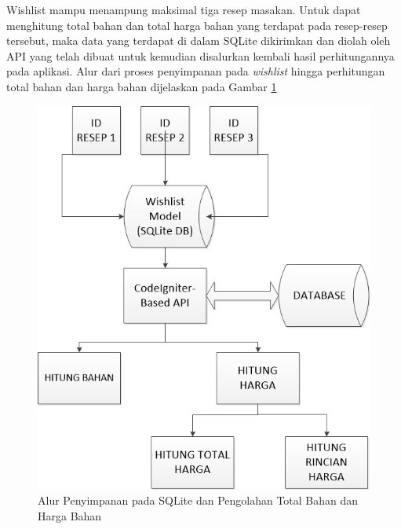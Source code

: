 		Wishlist mampu menampung maksimal tiga resep masakan. Untuk dapat menghitung total bahan dan total harga bahan yang terdapat pada resep-resep tersebut, maka data yang terdapat di dalam SQLite dikirimkan dan diolah oleh API yang telah dibuat untuk kemudian disalurkan kembali hasil perhitungannya pada aplikasi. Alur dari proses penyimpanan pada \textit{wishlist} hingga perhitungan total bahan dan harga bahan dijelaskan pada Gambar \ref{fitur-lain}
		\begin{figure}[H]
			\centering
			\includegraphics[width=1\textwidth]{gambar/new/fitur_lain}
			\caption{Alur Penyimpanan pada SQLite dan Pengolahan Total Bahan dan Harga Bahan}
			\label{fitur-lain}
		\end{figure}